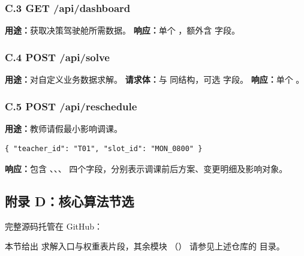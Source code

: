 \subsubsection*{C.3 GET /api/dashboard}

\textbf{用途：}获取决策驾驶舱所需数据。
\textbf{响应：}单个 ，额外含  字段。

\subsubsection*{C.4 POST /api/solve}

\textbf{用途：}对自定义业务数据求解。
\textbf{请求体：}与  同结构，可选  字段。
\textbf{响应：}单个 。

\subsubsection*{C.5 POST /api/reschedule}

\textbf{用途：}教师请假最小影响调课。

\begin{lstlisting}[style=cmjson]
{ "teacher_id": "T01", "slot_id": "MON_0800" }
\end{lstlisting}

\textbf{响应：}包含 、、、
四个字段，分别表示调课前后方案、变更明细及影响对象。

\subsection*{附录 D：核心算法节选}

完整源码托管在 GitHub：
\begin{center}
\end{center}

本节给出  求解入口与权重表片段，其余模块
（）
请参见上述仓库的  目录。

